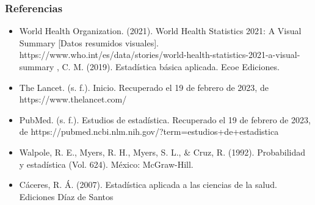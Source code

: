 \documentclass{beamer}
\begin{document}
\begin{frame}
\frametitle{Referencias}
\begin{itemize}
\item World Health Organization. (2021). World Health Statistics 2021: A Visual Summary [Datos resumidos visuales]. https://www.who.int/es/data/stories/world-health-statistics-2021-a-visual-summary 
\vspace{0.1cm}
\itemBencardino, C. M. (2019). Estadística básica aplicada. Ecoe Ediciones.
\vspace{0.1cm}
\item The Lancet. (s. f.). Inicio. Recuperado el 19 de febrero de 2023, de https://www.thelancet.com/
\vspace{0.1cm}
\item PubMed. (s. f.). Estudios de estadística. Recuperado el 19 de febrero de 2023, de https://pubmed.ncbi.nlm.nih.gov/?term=estudios+de+estadistica
\vspace{0.1cm}
\item Walpole, R. E., Myers, R. H., Myers, S. L., & Cruz, R. (1992). Probabilidad y estadística (Vol. 624). México: McGraw-Hill.
\vspace{0.1cm}
\item Cáceres, R. Á. (2007). Estadística aplicada a las ciencias de la salud. Ediciones Díaz de Santos
\vspace{0.1cm}
\end{itemize}
\end{frame}
\end{document}
